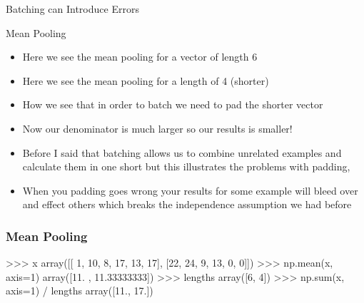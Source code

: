 \documentclass{beamer}
\begin{document}
\begin{section}{Batching can Introduce Errors}
\begin{subsection}{Mean Pooling}
\begin{frame}
{\begin{itemize}
                        features across a sentence to get the representation for the whole sentence.
                    \item Here we see the mean pooling for a vector of length 6
                    \item<2-> Here we see the mean pooling for a length of 4 (shorter)
                    \item<3-> How we see that in order to batch we need to pad the shorter vector
                    \item<3-> Now our denominator is much larger so our results is smaller!
                    \item<3-> Before I said that batching allows us to combine unrelated examples and calculate them in
                        one short but this illustrates the problems with padding,
                    \item<3-> When you padding goes wrong your results for some example will bleed over and effect
                        others which breaks the independence assumption we had before
                \end{itemize}
            }
        \end{frame}

\begin{frame}[fragile]
    \frametitle{Mean Pooling}

    \begin{pythoncode}
            >>> x
            array([[ 1, 10,  8, 17, 13, 17],
                   [22, 24,  9, 13,  0,  0]])
            >>> np.mean(x, axis=1)
            array([11.        , 11.33333333])
            >>> lengths
            array([6, 4])
            >>> np.sum(x, axis=1) / lengths
            array([11., 17.])
    \end{pythoncode}



\end{frame}
\end{subsection}
\end{section}
\end{document}
